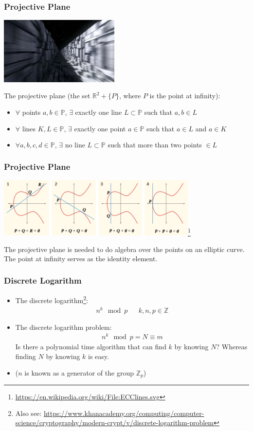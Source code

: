 \documentclass{beamer}
\begin{document}
\begin{frame}
\frametitle{Projective Plane}
\begin{center}
  \includegraphics[width=6cm]{Death_Star_trench.png}
\end{center}
The projective plane (the set $\mathbb R^2 + \{P\}$, where $P$ is the point at infinity):
\begin{itemize}
  \item $\forall$ points $a,b \in \mathbb P$, $\exists$ exactly one line $L \subset \mathbb P$ such that $a,b \in L$
  \item $\forall$ lines $K,L \in \mathbb P$, $\exists$ exactly one point $a \in \mathbb P$ such that $a \in L$ and $a \in K$
  \item $\forall a,b,c,d \in \mathbb P$, $\exists$ no line $L \subset \mathbb P$ such that more than two points $\in L$
\end{itemize}
\end{frame}

\begin{frame}
\frametitle{Projective Plane}
\begin{center}
  \includegraphics[width=10cm]{elliptic_curve_algebra.png}\footnote{\url{https://en.wikipedia.org/wiki/File:ECClines.svg}}
\end{center}
The projective plane is needed to do algebra over the points on an elliptic curve.  The point at infinity serves as the identity element.
\end{frame}

\begin{frame}
\frametitle{Discrete Logarithm}
\begin{itemize}
  \item The discrete logarithm\footnote{Also see: \url{https://www.khanacademy.org/computing/computer-science/cryptography/modern-crypt/v/discrete-logarithm-problem}}:
    \begin{align*}
      n^k \mod p && k,n,p \in \mathbb Z
    \end{align*}
  \item The discrete logarithm problem:
    \begin{align*}
      n^k \mod p = N \equiv m
    \end{align*}
    Is there a polynomial time algorithm that can find $k$ by knowing $N$?  Whereas finding $N$ by knowing $k$ is easy.
  \item ($n$ is known as a generator of the group $\mathbb Z_p$)
\end{itemize}
\end{frame}
\end{document}
